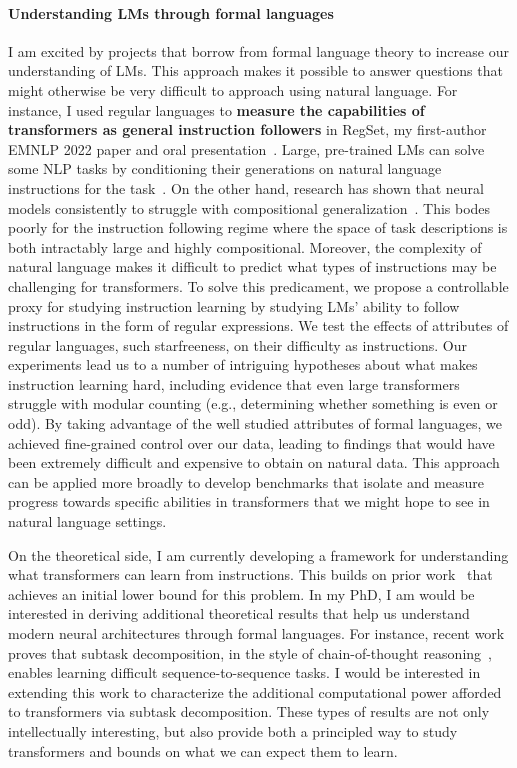 \documentclass[11pt]{article}
\begin{document}
\paragraph{Understanding LMs through formal languages}

I am excited by projects 
that borrow from formal language theory
to increase our understanding of LMs.
This approach makes it possible to answer 
questions that might otherwise be very difficult to approach using natural language.
For instance, I used regular languages to 
\textbf{measure the capabilities of transformers as general instruction followers}
in RegSet, my first-author EMNLP 2022 paper 
and oral presentation~\cite{Finlayson2022WhatMI}. 
Large, pre-trained LMs can solve some NLP tasks 
by conditioning their generations on natural language instructions 
for the task~\cite{mishra2021crosstask, Wei2021FinetunedLM}. 
On the other hand, 
research has shown that neural models consistently to struggle with
compositional generalization~\cite{Lake2018GeneralizationWS}. 
This bodes poorly for the instruction following regime
where the space of task descriptions is both intractably large 
and highly compositional.
Moreover, the complexity of natural language makes it difficult to
predict what types of instructions may be challenging for transformers.
To solve this predicament, 
we propose a controllable proxy for studying instruction learning
by studying LMs' ability to follow instructions in the form of regular expressions.
We test the effects of attributes of regular languages,
such starfreeness, on their difficulty as instructions.
Our experiments lead us to a number of intriguing hypotheses 
about what makes instruction learning hard, 
including evidence that even large transformers struggle with modular counting 
(e.g., determining whether something is even or odd). 
By taking advantage of the well studied attributes of formal languages,
we achieved fine-grained control over our data, leading to findings that
would have been extremely difficult and expensive to obtain on natural data.
This approach can be applied more broadly to develop benchmarks 
that isolate and measure progress towards specific abilities 
in transformers that we might hope to see in natural language settings.

On the theoretical side, I am currently developing a framework for 
understanding what transformers can learn from instructions. 
This builds on prior work~\cite{Merrill2022LogPrecisionTA}
that achieves an initial lower bound for this problem.
In my PhD, I am would be interested 
in deriving additional theoretical results 
that help us understand modern neural architectures 
through formal languages.
For instance, recent work~\cite{Wies2022SubTaskDE} 
proves that subtask decomposition,
in the style of chain-of-thought reasoning~\cite{Wei2022ChainOT},
enables learning difficult sequence-to-sequence tasks.
I would be interested in extending this work 
to characterize the additional computational power 
afforded to transformers via subtask decomposition.
These types of results are not only intellectually interesting,
but also provide both a principled way to study transformers 
and bounds on what we can expect them to learn.
\end{document}
